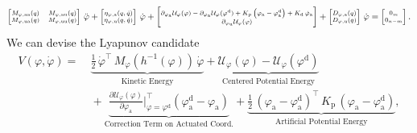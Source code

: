 \begin{equation}\scriptsize
    \begin{bmatrix}
        M_{\varphi,\mathrm{aa}}(q) & M_{\varphi,\mathrm{au}}(q)\\ 
        M_{\varphi,\mathrm{ua}}(q) & M_{\varphi,\mathrm{uu}}(q)
    \end{bmatrix} \, \ddot{\varphi} + \begin{bmatrix}
        \eta_{\varphi,\mathrm{a}}(q,\dot{q})\\ \eta_{\varphi,\mathrm{u}}(q,\dot{q})
    \end{bmatrix} \, \dot{\varphi} + \begin{bmatrix}
       \partial_{\varphi_\mathrm{a}} \mathcal{U}_\varphi(\varphi) - \partial_{\varphi_\mathrm{a}} \mathcal{U}_\varphi(\varphi^\mathrm{d}) + K_\mathrm{p} \left ( \varphi_\mathrm{a} - \varphi^\mathrm{d}_\mathrm{a} \right ) + K_\mathrm{d} \, \dot{\varphi}_\mathrm{a}\\
       \partial_{\varphi_\mathrm{u}} \mathcal{U}_\varphi(\varphi)
    \end{bmatrix} + \begin{bmatrix}
        D_{\varphi,\mathrm{a}}(q)\\
        D_{\varphi,\mathrm{u}}(q)
    \end{bmatrix} \, \dot{\varphi} = \begin{bmatrix}
        0_m\\ 0_{n-m}
    \end{bmatrix}.
\end{equation}
We can devise the Lyapunov candidate
\begin{equation}
\begin{split}
    V(\varphi, \dot{\varphi}) =& \: \underbrace{\frac{1}{2} \, \dot{\varphi}^\top \, M_\varphi(h^{-1}(\varphi)) \, \dot{\varphi}}_\text{Kinetic Energy} + \underbrace{\mathcal{U}_\varphi(\varphi) - \mathcal{U}_\varphi(\varphi^\mathrm{d})}_\text{Centered Potential Energy}\\
    & \: + \underbrace{\frac{\partial \mathcal{U}_\varphi(\varphi)}{\partial \varphi_\mathrm{a}} \Bigg |_{\varphi = \varphi^\mathrm{d}}^\top \left ( \varphi_\mathrm{a}^\mathrm{d} - \varphi_\mathrm{a} \right )}_\text{Correction Term on Actuated Coord.} + \underbrace{\frac{1}{2} \, (\varphi_\mathrm{a}-\varphi_\mathrm{a}^\mathrm{d})^\top \, K_\mathrm{p} \, (\varphi_\mathrm{a}-\varphi_\mathrm{a}^\mathrm{d})}_\text{Artificial Potential Energy},
\end{split}
\end{equation}
